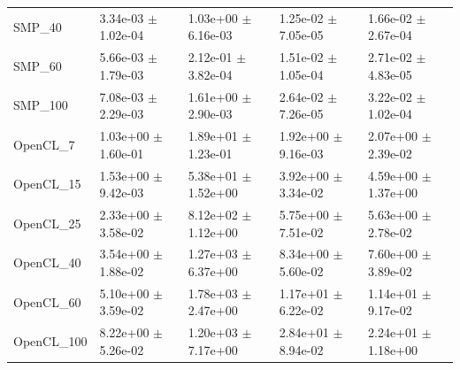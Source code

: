 \documentclass[12pt, a4paper]{report}
\begin{document}
\begin{table}
\begin{tabular}{l|l|l|l|l}
		SMP\_40 & 3.34e-03 $\pm$ 1.02e-04 & 1.03e+00 $\pm$ 6.16e-03 & 1.25e-02 $\pm$ 7.05e-05 & 1.66e-02 $\pm$ 2.67e-04 \\
		SMP\_60 & 5.66e-03 $\pm$ 1.79e-03 & 2.12e-01 $\pm$ 3.82e-04 & 1.51e-02 $\pm$ 1.05e-04 & 2.71e-02 $\pm$ 4.83e-05 \\
		SMP\_100 & 7.08e-03 $\pm$ 2.29e-03 & 1.61e+00 $\pm$ 2.90e-03 & 2.64e-02 $\pm$ 7.26e-05 & 3.22e-02 $\pm$ 1.02e-04 \\
		\hline
		OpenCL\_7 & 1.03e+00 $\pm$ 1.60e-01 & 1.89e+01 $\pm$ 1.23e-01 & 1.92e+00 $\pm$ 9.16e-03 & 2.07e+00 $\pm$ 2.39e-02 \\
		OpenCL\_15 & 1.53e+00 $\pm$ 9.42e-03 & 5.38e+01 $\pm$ 1.52e+00 & 3.92e+00 $\pm$ 3.34e-02 & 4.59e+00 $\pm$ 1.37e+00 \\
		OpenCL\_25 & 2.33e+00 $\pm$ 3.58e-02 & 8.12e+02 $\pm$ 1.12e+00 & 5.75e+00 $\pm$ 7.51e-02 & 5.63e+00 $\pm$ 2.78e-02 \\
		OpenCL\_40 & 3.54e+00 $\pm$ 1.88e-02 & 1.27e+03 $\pm$ 6.37e+00 & 8.34e+00 $\pm$ 5.60e-02 & 7.60e+00 $\pm$ 3.89e-02 \\
		OpenCL\_60 & 5.10e+00 $\pm$ 3.59e-02 & 1.78e+03 $\pm$ 2.47e+00 & 1.17e+01 $\pm$ 6.22e-02 & 1.14e+01 $\pm$ 9.17e-02 \\
		OpenCL\_100 & 8.22e+00 $\pm$ 5.26e-02 & 1.20e+03 $\pm$ 7.17e+00 & 2.84e+01 $\pm$ 8.94e-02 & 2.24e+01 $\pm$ 1.18e+00 \\
	\end{tabular}
\end{table}
\end{document}
